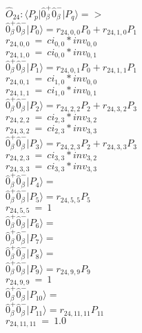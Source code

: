 \documentclass[14pt]{article}
\begin{document}
    $\hat{O}_{24}:  \langle{P_p}\vert \hat{0}_{\beta}^{+}\hat{0}_{\beta}^{-} \vert{P_q}\rangle => $ \\ 
    $ \hat{0}_{\beta}^{+}\hat{0}_{\beta}^{-} \vert{P_{0}}\rangle = {r}_{24,0,0}P_{0}+{r}_{24,1,0}P_{1} $ \\ 
    ${r}_{24,0,0}\ =\ {ci}_{0,0}*{inv}_{0,0} $ \\ 
    ${r}_{24,1,0}\ =\ {ci}_{0,0}*{inv}_{0,1} $ \\ 
    $ \hat{0}_{\beta}^{+}\hat{0}_{\beta}^{-} \vert{P_{1}}\rangle = {r}_{24,0,1}P_{0}+{r}_{24,1,1}P_{1} $ \\ 
    ${r}_{24,0,1}\ =\ {ci}_{1,0}*{inv}_{0,0} $ \\ 
    ${r}_{24,1,1}\ =\ {ci}_{1,0}*{inv}_{0,1} $ \\ 
    $ \hat{0}_{\beta}^{+}\hat{0}_{\beta}^{-} \vert{P_{2}}\rangle = {r}_{24,2,2}P_{2}+{r}_{24,3,2}P_{3} $ \\ 
    ${r}_{24,2,2}\ =\ {ci}_{2,3}*{inv}_{3,2} $ \\ 
    ${r}_{24,3,2}\ =\ {ci}_{2,3}*{inv}_{3,3} $ \\ 
    $ \hat{0}_{\beta}^{+}\hat{0}_{\beta}^{-} \vert{P_{3}}\rangle = {r}_{24,2,3}P_{2}+{r}_{24,3,3}P_{3} $ \\ 
    ${r}_{24,2,3}\ =\ {ci}_{3,3}*{inv}_{3,2} $ \\ 
    ${r}_{24,3,3}\ =\ {ci}_{3,3}*{inv}_{3,3} $ \\ 
    $ \hat{0}_{\beta}^{+}\hat{0}_{\beta}^{-} \vert{P_{4}}\rangle =  $ \\ 
    $ \hat{0}_{\beta}^{+}\hat{0}_{\beta}^{-} \vert{P_{5}}\rangle = {r}_{24,5,5}P_{5} $ \\ 
    ${r}_{24,5,5}\ =\ 1 $ \\ 
    $ \hat{0}_{\beta}^{+}\hat{0}_{\beta}^{-} \vert{P_{6}}\rangle =  $ \\ 
    $ \hat{0}_{\beta}^{+}\hat{0}_{\beta}^{-} \vert{P_{7}}\rangle =  $ \\ 
    $ \hat{0}_{\beta}^{+}\hat{0}_{\beta}^{-} \vert{P_{8}}\rangle =  $ \\ 
    $ \hat{0}_{\beta}^{+}\hat{0}_{\beta}^{-} \vert{P_{9}}\rangle = {r}_{24,9,9}P_{9} $ \\ 
    ${r}_{24,9,9}\ =\ 1 $ \\ 
    $ \hat{0}_{\beta}^{+}\hat{0}_{\beta}^{-} \vert{P_{10}}\rangle =  $ \\ 
    $ \hat{0}_{\beta}^{+}\hat{0}_{\beta}^{-} \vert{P_{11}}\rangle = {r}_{24,11,11}P_{11} $ \\ 
    ${r}_{24,11,11}\ =\ 1.0 $ \\ 
\end{document}
